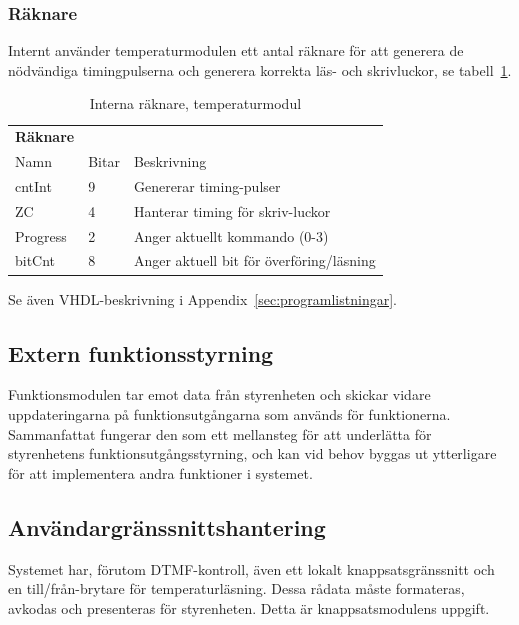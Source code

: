 \documentclass[a4paper,11pt]{article}
\begin{document}
	\subsubsection{Räknare}
	
	Internt använder temperaturmodulen ett antal räknare för att generera de nödvändiga timingpulserna och generera korrekta läs- och skrivluckor, se tabell~\ref{tab:cntTabell}.

	\begin{table} [H]
		
		\caption{Interna räknare, temperaturmodul} 
		\label{tab:cntTabell}
	\begin{tabular}{l l l}
		
		{\bf Räknare}
		\\{Namn} & {Bitar} & {Beskrivning}\\
		\hline
			cntInt & 9 & Genererar timing-pulser\\
			ZC & 4 & Hanterar timing för skriv-luckor\\
			Progress & 2 & Anger aktuellt kommando (0-3)\\
			bitCnt & 8 & Anger aktuell bit för överföring/läsning\\
	\end{tabular}
	\end{table}

	Se även VHDL-beskrivning i Appendix~\ref{sec:programlistningar}. \\

	\subsection{Extern funktionsstyrning}

Funktionsmodulen tar emot data från styrenheten och skickar vidare 
uppdateringarna på funktionsutgångarna som används för funktionerna. Sammanfattat fungerar den som ett
mellansteg för att underlätta för styrenhetens funktionsutgångsstyrning, och kan vid behov byggas ut ytterligare
för att implementera andra funktioner i systemet.

	\subsection{Användargränssnittshantering}

Systemet har, förutom DTMF-kontroll, även ett lokalt knappsatsgränssnitt och en till/från-brytare för temperaturläsning.
Dessa rådata måste formateras, avkodas och presenteras för styrenheten. Detta är knappsatsmodulens uppgift.
\end{document}
